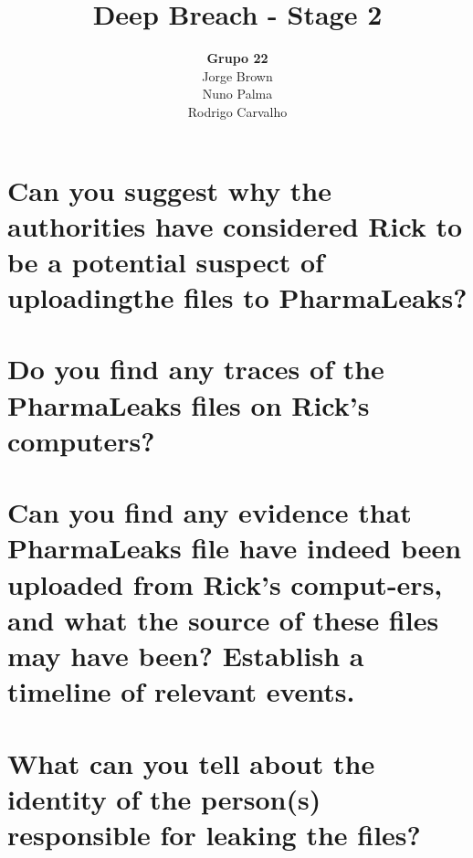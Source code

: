\documentclass{report}
\author{\textbf{\huge{Grupo 22}}\vspace{2cm}\\Jorge Brown\\Nuno Palma\\Rodrigo Carvalho}
\title{\textbf{\Huge{Deep Breach - Stage 2}}}
\begin{document}
    \maketitle
    \tableofcontents
    \newpage

    \section{Can you suggest why the authorities have considered Rick to be a potential suspect of uploadingthe files to PharmaLeaks?}
    

    \section{Do you find any traces of the PharmaLeaks files on Rick’s computers?}
    

    \section{Can you find any evidence that PharmaLeaks file have indeed been uploaded from Rick’s comput-ers, and what the source of these files may have been? Establish a timeline of relevant events.}
    

    \section{What can you tell about the identity of the person(s) responsible for leaking the files?}
    
\end{document}
